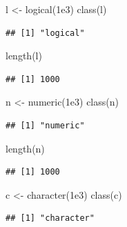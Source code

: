 \documentclass[
]{book}
\newenvironment{Shaded}{\begin{snugshade}}{\end{snugshade}}
\newcommand{\FloatTok}[1]{\textcolor[rgb]{0.00,0.00,0.81}{#1}}
\newcommand{\FunctionTok}[1]{\textcolor[rgb]{0.00,0.00,0.00}{#1}}
\newcommand{\NormalTok}[1]{#1}
\newcommand{\OtherTok}[1]{\textcolor[rgb]{0.56,0.35,0.01}{#1}}
\begin{document}
\begin{Shaded}
\begin{Highlighting}[]
\NormalTok{l }\OtherTok{\textless{}{-}} \FunctionTok{logical}\NormalTok{(}\FloatTok{1e3}\NormalTok{)}
\FunctionTok{class}\NormalTok{(l)}
\end{Highlighting}
\end{Shaded}

\begin{verbatim}
## [1] "logical"
\end{verbatim}

\begin{Shaded}
\begin{Highlighting}[]
\FunctionTok{length}\NormalTok{(l)}
\end{Highlighting}
\end{Shaded}

\begin{verbatim}
## [1] 1000
\end{verbatim}

\begin{Shaded}
\begin{Highlighting}[]
\NormalTok{n }\OtherTok{\textless{}{-}} \FunctionTok{numeric}\NormalTok{(}\FloatTok{1e3}\NormalTok{)}
\FunctionTok{class}\NormalTok{(n)}
\end{Highlighting}
\end{Shaded}

\begin{verbatim}
## [1] "numeric"
\end{verbatim}

\begin{Shaded}
\begin{Highlighting}[]
\FunctionTok{length}\NormalTok{(n)}
\end{Highlighting}
\end{Shaded}

\begin{verbatim}
## [1] 1000
\end{verbatim}

\begin{Shaded}
\begin{Highlighting}[]
\NormalTok{c }\OtherTok{\textless{}{-}} \FunctionTok{character}\NormalTok{(}\FloatTok{1e3}\NormalTok{)}
\FunctionTok{class}\NormalTok{(c)}
\end{Highlighting}
\end{Shaded}

\begin{verbatim}
## [1] "character"
\end{verbatim}
\end{document}
